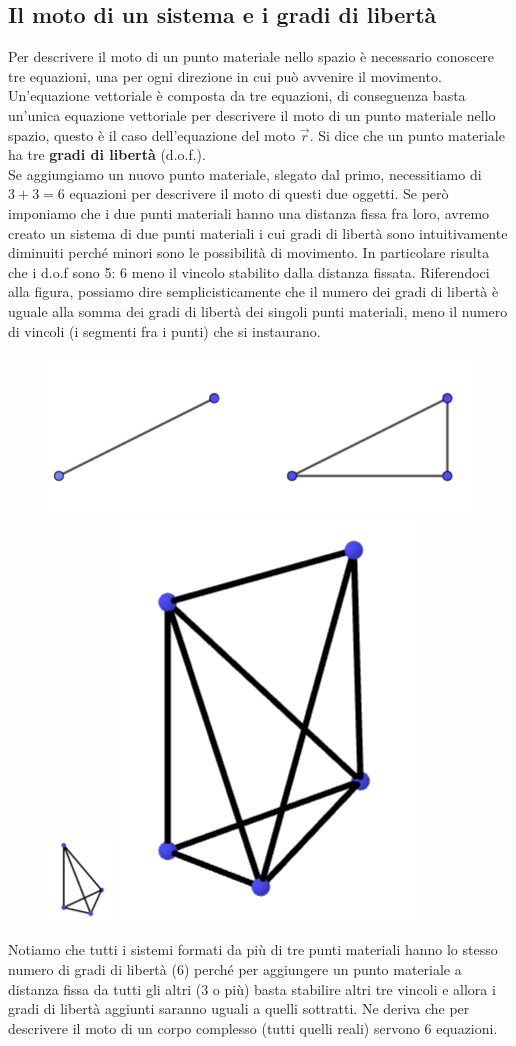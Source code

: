 \documentclass[10pt,a4paper]{article}
\begin{document}
\subsection{Il moto di un sistema e i gradi di libertà}
Per descrivere il moto di un punto materiale nello spazio è necessario conoscere tre equazioni, una per ogni direzione in cui può avvenire il movimento. Un'equazione vettoriale è composta da tre equazioni, di conseguenza basta un'unica equazione vettoriale per descrivere il moto di un punto materiale nello spazio, questo è il caso dell'equazione del moto $\vec{r}$. Si dice che un punto materiale ha tre \textbf{gradi di libertà} (d.o.f.).\\
Se aggiungiamo un nuovo punto materiale, slegato dal primo, necessitiamo di $3+3=6$ equazioni per descrivere il moto di questi due oggetti. Se però imponiamo che i due punti materiali hanno una distanza fissa fra loro, avremo creato un sistema di due punti materiali i cui gradi di libertà sono intuitivamente diminuiti perché minori sono le possibilità di movimento. In particolare risulta che i d.o.f sono 5: 6 meno il vincolo stabilito dalla distanza fissata. Riferendoci alla figura, possiamo dire semplicisticamente che il numero dei gradi di libertà è uguale alla somma dei gradi di libertà dei singoli punti materiali, meno il numero di vincoli (i segmenti fra i punti) che si instaurano. \\

\begin{figure}[h]
	\centering
	\includegraphics[width=0.4\linewidth]{"Screenshot 2021-11-13 161007"}
	\includegraphics[width=0.15\textwidth]{"Screenshot 2021-11-13 161243"}
	\label{fig:screenshot-2021-11-13-161007}
	\includegraphics[width=0.15\linewidth]{"Screenshot 2021-11-13 161431"}
	\label{fig:screenshot-2021-11-13-161431}
\end{figure}
Notiamo che tutti i sistemi formati da più di tre punti materiali hanno lo stesso numero di gradi di libertà (6) perché per aggiungere un punto materiale a distanza fissa da tutti gli altri (3 o più) basta stabilire altri tre vincoli e allora i gradi di libertà aggiunti saranno uguali a quelli sottratti. Ne deriva che per descrivere il moto di un corpo complesso (tutti quelli reali) servono 6 equazioni.
\end{document}
